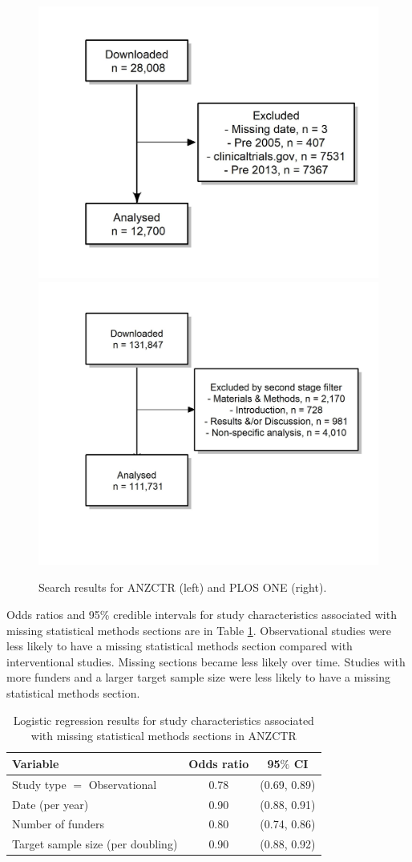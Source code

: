 \documentclass[12pt]{article}
\begin{document}
\begin{figure}[htbp]

{\centering \includegraphics[width=0.49\linewidth]{figures/excluded_anzctr_missing}  \includegraphics[width=0.49\linewidth]{figures/excluded_plosone}

}

\caption{\label{fig:consort-diagrams}Search results for ANZCTR (left) and PLOS ONE (right).}
\end{figure}


Odds ratios and 95\% credible intervals for study characteristics
associated with missing statistical methods sections are in Table
\ref{tab:anzctr-missing-odds}. Observational studies were less likely to
have a missing statistical methods section compared with interventional
studies. Missing sections became less likely over time. Studies with
more funders and a larger target sample size were less likely to have a
missing statistical methods section.

\begin{table}[]
\centering
\caption{Logistic regression results for study characteristics associated with missing statistical methods sections in ANZCTR}
\label{tab:anzctr-missing-odds}
\begin{tabular}{lcc}
\hline
Variable & Odds ratio & 95$\%$ CI \\
\hline
Study type $=$ Observational & 0.78 & (0.69, 0.89) \\
Date (per year) & 0.90 & (0.88, 0.91) \\
Number of funders & 0.80 & (0.74, 0.86) \\
Target sample size (per doubling) & 0.90 & (0.88, 0.92)\\
\hline
\end{tabular}
\end{table}
\end{document}
